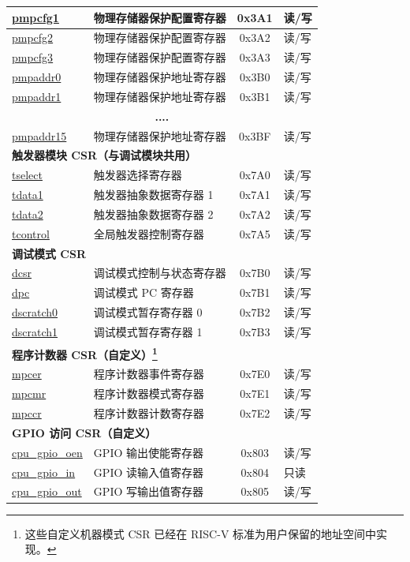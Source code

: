 \begin{longtable}{ | p{4.0cm} | p{8.4cm} | c | l | }
\hyperref[sec:riscvcpu-pmp-reg-desc]{pmpcfg1} & 物理存储器保护配置寄存器 & 0x3A1 & 读/写 \\\hline
\hyperref[sec:riscvcpu-pmp-reg-desc]{pmpcfg2} & 物理存储器保护配置寄存器 & 0x3A2 & 读/写 \\\hline
\hyperref[sec:riscvcpu-pmp-reg-desc]{pmpcfg3} & 物理存储器保护配置寄存器 & 0x3A3 & 读/写 \\\hline
\hyperref[sec:riscvcpu-pmp-reg-desc]{pmpaddr0} & 物理存储器保护地址寄存器 & 0x3B0 & 读/写 \\\hline
\hyperref[sec:riscvcpu-pmp-reg-desc]{pmpaddr1} & 物理存储器保护地址寄存器 & 0x3B1 & 读/写 \\\hline
\multicolumn{4}{|c|}{\textbf{....}} \\\hline
\hyperref[sec:riscvcpu-pmp-reg-desc]{pmpaddr15} & 物理存储器保护地址寄存器 & 0x3BF & 读/写 \\\hline
\multicolumn{4}{|l|}{\textbf{触发器模块 CSR（与调试模块共用）}} \\\hline
\hyperref[regdesc:TSELECT]{tselect} & 触发器选择寄存器 & 0x7A0 & 读/写 \\\hline
\hyperref[regdesc:TDATA1]{tdata1} & 触发器抽象数据寄存器 1  & 0x7A1 & 读/写 \\\hline
\hyperref[regdesc:TDATA2]{tdata2} & 触发器抽象数据寄存器 2 & 0x7A2 & 读/写 \\\hline
\hyperref[regdesc:TCONTROL]{tcontrol} & 全局触发器控制寄存器 & 0x7A5 & 读/写 \\\hline
\multicolumn{4}{|l|}{\textbf{调试模式 CSR}} \\\hline
\hyperref[regdesc:DCSR]{dcsr} & 调试模式控制与状态寄存器  & 0x7B0 & 读/写 \\\hline
\hyperref[regdesc:DPC]{dpc} & 调试模式 PC 寄存器 & 0x7B1 & 读/写 \\\hline
\hyperref[regdesc:DSCRATCH0]{dscratch0} & 调试模式暂存寄存器 0 & 0x7B2 & 读/写 \\\hline
\hyperref[regdesc:DSCRATCH1]{dscratch1} & 调试模式暂存寄存器 1 & 0x7B3 & 读/写 \\\hline
\multicolumn{4}{|l|}{\textbf{程序计数器 CSR（自定义）\footnote{这些自定义机器模式 CSR 已经在 RISC-V 标准为用户保留的地址空间中实现。}}} \\\hline
\hyperref[regdesc:MPCER]{mpcer} & 程序计数器事件寄存器 & 0x7E0 & 读/写 \\\hline
\hyperref[regdesc:MPCMR]{mpcmr} & 程序计数器模式寄存器 & 0x7E1 & 读/写 \\\hline
\hyperref[regdesc:MPCCR]{mpccr} & 程序计数器计数寄存器 & 0x7E2 & 读/写 \\\hline
\multicolumn{4}{|l|}{\textbf{GPIO 访问 CSR（自定义）}} \\\hline
\hyperref[regdesc:GPIO_OEN]{cpu\_gpio\_oen} & GPIO 输出使能寄存器 & 0x803 & 读/写  \\\hline
\hyperref[regdesc:GPIO_IN]{cpu\_gpio\_in} & GPIO 读输入值寄存器 & 0x804 & 只读 \\\hline
\hyperref[regdesc:GPIO_OUT]{cpu\_gpio\_out} & GPIO 写输出值寄存器 & 0x805 & 读/写  \\\hline
\end{longtable}

